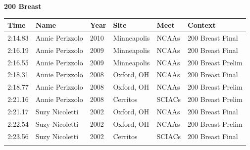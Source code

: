 \vspace{1.2em}
\noindent\begin{minipage}[t]{0.98\textwidth}
\centering
\textbf{\textcolor{teamprimary}{200 Breast}}\par
\vspace{0.5em}
\centering
\small
\renewcommand{\arraystretch}{1.0}
\setlength{\tabcolsep}{4pt}
\begin{tabular}{@{}p{2.0cm}p{3.2cm}p{1.2cm}p{2.0cm}p{2.0cm}p{2.5cm}@{}}
\toprule
\textbf{Time} & \textbf{Name} & \textbf{Year} & \textbf{Site} & \textbf{Meet} & \textbf{Context} \\
\midrule
2:14.83 & Annie Perizzolo & 2010 & Minneapolis & NCAAs & 200 Breast Final \\
2:16.19 & Annie Perizzolo & 2009 & Minneapolis & NCAAs & 200 Breast Final \\
2:16.55 & Annie Perizzolo & 2009 & Minneapolis & NCAAs & 200 Breast Prelim \\
2:18.31 & Annie Perizzolo & 2008 & Oxford, OH & NCAAs & 200 Breast Final \\
2:18.77 & Annie Perizzolo & 2008 & Oxford, OH & NCAAs & 200 Breast Prelim \\
2:21.16 & Annie Perizzolo & 2008 & Cerritos & SCIACs & 200 Breast Prelim \\
2:21.17 & Suzy Nicoletti & 2002 & Oxford, OH & NCAAs & 200 Breast Final \\
2:22.54 & Suzy Nicoletti & 2002 & Oxford, OH & NCAAs & 200 Breast Prelim \\
2:23.56 & Suzy Nicoletti & 2002 & Cerritos & SCIACs & 200 Breast Final \\
\bottomrule
\vspace{0.5em}
\end{tabular}
\end{minipage}
\vspace{1.2em}
